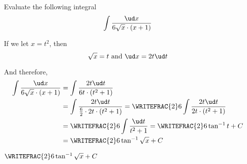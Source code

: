 



\question[5] Evaluate the following integral
  \[ \int\dfrac{\ud x}{\va\sqrt{x}\cdot (x+1) }\] 

\watchout

\begin{solution}[\halfpage]
  If we let $x=t^2$, then 
  \[ \sqrt{x} = t\text{ and } \ud x = 2t\ud t \] 

  And therefore, 
  \begin{align}
    \int\dfrac{\ud x}{\va\sqrt{x}\cdot (x+1)} &= 
    \int\dfrac{2t\ud t}{\va t\cdot (t^2 + 1)} \\
    &= \int\dfrac{2t\ud t}{\frac\va{2}\cdot 2t\cdot(t^2+1)} 
    = \WRITEFRAC{2}\va\int\dfrac{2t\ud t}{2t\cdot (t^2+1)} \\
    &= \WRITEFRAC{2}\va\int\dfrac{\ud t}{t^2 + 1} = \WRITEFRAC{2}\va\tan^{-1}t + C  \\
    &=\WRITEFRAC{2}\va\tan^{-1}\sqrt{x} + C
  \end{align}
\end{solution}


\ifprintanswers
  \begin{codex}
    $\WRITEFRAC{2}\va\tan^{-1}\sqrt{x} + C$
  \end{codex}
\fi
